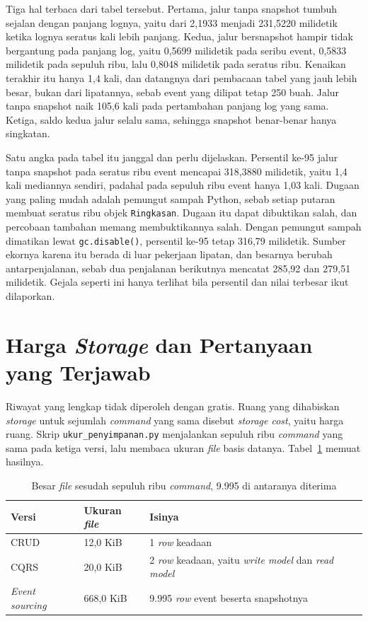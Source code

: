 Tiga hal terbaca dari tabel tersebut. Pertama, jalur tanpa snapshot tumbuh
sejalan dengan panjang lognya, yaitu dari 2,1933 menjadi 231,5220 milidetik
ketika lognya seratus kali lebih panjang. Kedua, jalur bersnapshot hampir
tidak bergantung pada panjang log, yaitu 0,5699 milidetik pada seribu event,
0,5833 milidetik pada sepuluh ribu, lalu 0,8048 milidetik pada seratus ribu.
Kenaikan terakhir itu hanya 1,4 kali, dan datangnya dari pembacaan tabel yang
jauh lebih besar, bukan dari lipatannya, sebab event yang dilipat tetap 250
buah. Jalur tanpa snapshot naik 105,6 kali pada pertambahan panjang log yang
sama. Ketiga, saldo kedua jalur
selalu sama, sehingga snapshot benar-benar hanya singkatan.

Satu angka pada tabel itu janggal dan perlu dijelaskan. Persentil
ke-95 jalur
tanpa snapshot pada seratus ribu event mencapai 318,3880 milidetik, yaitu
1,4 kali mediannya sendiri, padahal pada sepuluh ribu event hanya 1,03 kali.
Dugaan yang paling mudah adalah pemungut sampah Python, sebab setiap putaran
membuat seratus ribu objek \texttt{Ringkasan}. Dugaan itu dapat dibuktikan
salah, dan percobaan tambahan memang membuktikannya salah. Dengan pemungut
sampah dimatikan lewat \texttt{gc.disable()}, persentil ke-95 tetap 316,79
milidetik. Sumber ekornya karena itu berada di luar pekerjaan lipatan, dan
besarnya berubah antarpenjalanan, sebab dua penjalanan berikutnya mencatat
285,92 dan 279,51 milidetik. Gejala seperti ini hanya terlihat bila persentil
dan nilai terbesar ikut dilaporkan.

\section{Harga \textit{Storage} dan Pertanyaan yang Terjawab}

Riwayat yang lengkap tidak diperoleh dengan gratis. Ruang yang dihabiskan
\textit{storage} untuk sejumlah \textit{command} yang sama disebut
\textit{storage cost}, yaitu harga
ruang. Skrip \texttt{ukur\_penyimpanan.py} menjalankan sepuluh ribu
\textit{command} yang sama pada ketiga versi, lalu membaca ukuran \textit{file}
basis datanya.
Tabel~\ref{tab:penyimpanan} memuat hasilnya.

\begin{table}[htbp]
  \centering
  \caption{Besar \textit{file} sesudah sepuluh ribu \textit{command}, 9.995 di antaranya
    diterima}
  \label{tab:penyimpanan}
  \begin{tabularx}{\textwidth}{|l|l|X|}
    \hline
    \textbf{Versi} & \textbf{Ukuran \textit{file}} & \textbf{Isinya} \\
    \hline
    CRUD & 12,0 KiB & 1 \textit{row} keadaan \\
    \hline
    CQRS & 20,0 KiB & 2 \textit{row} keadaan, yaitu \textit{write model} dan \textit{read model} \\
    \hline
    \textit{Event sourcing} & 668,0 KiB & 9.995 \textit{row} event beserta snapshotnya \\
    \hline
  \end{tabularx}
\end{table}

